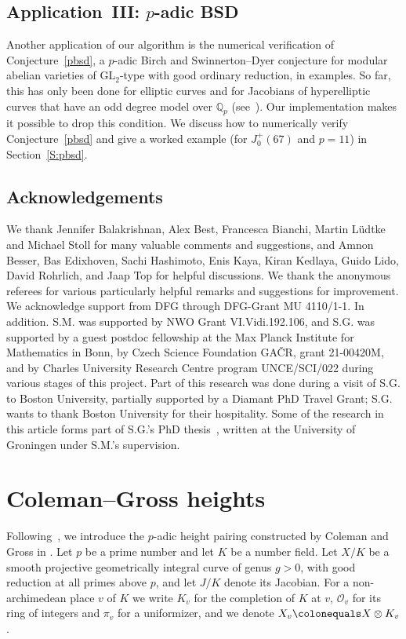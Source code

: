 \documentclass[11pt, a4paper]{amsart}
\newcommand{\Q}{\mathbb{Q}}
\renewcommand{\O}{\mathcal{O}}
\renewcommand{\O}{\mathcal{O}}
\theoremstyle{remark}
\numberwithin{equation}{section}
\begin{document}
\subsection{Application~III: $p$-adic BSD}\label{subsec:pbsd}
Another
application of our algorithm is the numerical verification of Conjecture~\ref{pbsd}, a $p$-adic Birch and Swinnerton--Dyer
conjecture for modular abelian varieties of $\mathrm{GL}_2$-type with good ordinary reduction, in examples.
So far, this has only been done for elliptic curves and for
Jacobians of hyperelliptic curves that have an odd degree model over $\Q_p$
(see~\cite{BMS16}). Our implementation makes it possible to drop this
condition.
We discuss how to numerically verify Conjecture~\ref{pbsd} and give
a worked example (for $J_0^+(67)$ and $p=11$) in Section~\ref{S:pbsd}. 


\subsection*{Acknowledgements}
We thank 
Jennifer Balakrishnan, Alex Best, Francesca Bianchi, Martin L\"udtke and Michael Stoll for many valuable comments and suggestions, and Amnon Besser, Bas Edixhoven, Sachi Hashimoto, Enis Kaya, Kiran Kedlaya, Guido Lido, David Rohrlich, and Jaap Top for helpful discussions. 
We thank the anonymous referees for various particularly helpful remarks and suggestions for
improvement.
We acknowledge support from DFG through DFG-Grant MU 4110/1-1. 
In addition. S.M. was supported by NWO Grant VI.Vidi.192.106, and S.G. was
supported by a guest postdoc fellowship at the Max Planck Institute for
Mathematics in Bonn, by Czech Science Foundation GAČR, grant 21-00420M, and
by Charles University Research Centre program UNCE/SCI/022 during various
stages of this project. 
Part of this research was done during a visit of S.G. to Boston University,
partially supported by a Diamant PhD Travel Grant; S.G. wants to thank
Boston University for their hospitality.
Some of the research in this article forms part of S.G.'s PhD
thesis~\cite{Gajovic-thesis}, written at the University of Groningen under
S.M.'s supervision.


\section{Coleman--Gross heights} \label{sec:Coleman-Gross}
Following~\cite[Section~2]{BBHeights}, we introduce the $p$-adic height
pairing constructed by Coleman and Gross in \cite{Coleman-Gross-Heights}. Let $p$ be a prime number and let $K$ be a number
field. Let $X/K$  be a 
smooth projective geometrically integral  curve of genus $g>0$, with good reduction at all
primes above $p$, and let $J/K$ denote its Jacobian. 
For a non-archimedean place $v$ of $K$ we write $K_v$ for the completion of $K$ at
$v$, $\O_v$ for its ring of integers and $\pi_v$ for a uniformizer, and we denote
$X_v\colonequals X\otimes K_v$.
\end{document}
